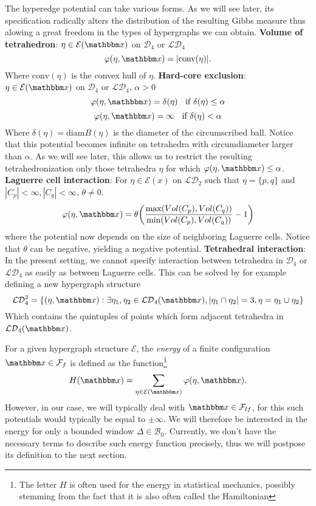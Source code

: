 \begin{example}
	The hyperedge potential can take various forms. As we will see later, its specification radically alters the distribution of the resulting Gibbs measure thus alowing a great freedom in the types of hypergraphs we can obtain.\newline
	\textbf{Volume of tetrahedron}: $\eta\in\mathcal E(\x)$ on $\mathcal D_4$ or $\mathcal {LD}_4$
	$$\varphi(\eta,\x) = |\text{conv}(\eta)| .$$
	Where $\text{conv}(\eta)$ is the convex hull of $\eta$.	\newline
	\textbf{Hard-core exclusion}: $\eta\in\mathcal E(\x)$ on $\mathcal D_4$ or $\mathcal {LD}_4$, $\alpha >0$
	$$\varphi(\eta,\x) = \delta(\eta)\;\; \text{ if } \delta(\eta) \leq \alpha$$
	$$\varphi(\eta,\x) = \infty \;\; \text { if } \delta(\eta) < \alpha$$
	Where $\delta(\eta)= \text{diam}B(\eta)$ is the diameter of the circumscribed ball. Notice that this potential becomes infinite on tetrahedra with circumdiameter larger than $\alpha$. As we will see later, this allows us to restrict the resulting tetrahedronization only those tetrahedra $\eta$ for which $\varphi(\eta,\x) \leq \alpha$.\newline
	\textbf{Laguerre cell interaction}: For $\eta \in \mathcal E(x)$ on $\mathcal {LD}_2$ such that $\eta=\{p,q\}$ and $|C_p| < \infty, |C_q| < \infty$, $\theta \neq 0$.
$$\varphi(\eta,\x) = \theta \bigg (\frac {\max ( Vol(C_p), Vol(C_q))}{\min(Vol(C_p),Vol(C_q))} - 1\bigg)$$
where the potential now depends on the size of neighboring Laguerre cells. Notice that $\theta$ can be negative, yielding a negative potential. \newline
\textbf{Tetrahedral interaction}: In the present setting, we cannot specify interaction between tetrahedra in $\mathcal D_4$ or $\mathcal {LD}_4$ as easily as between Laguerre cells. This can be solved by for example defining a new hypergraph structure
$$\mathcal {LD}^2_4 = \{(\eta,\x): \exists \eta_1,\eta_2\in\mathcal {LD}_4(\x), |\eta_1 \cap \eta_2|=3, \eta = \eta_1 \cup \eta_2\}$$
Which contains the quintuples of points which form adjacent tetrahedra in $\mathcal {LD}_4(\x)$. 
	
\end{example}


For a given hypergraph structure $\mathcal E$, the \textit{energy} of a finite configuration $\x\in\mathcal F_{f}$ is defined as the function\footnote{The letter $H$ is often used for the energy in statistical mechanics, possibly stemming from the fact that it is also often called the Hamiltonian}
$$H(\x) = \sum_{\eta \in \mathcal E(\x)} \varphi(\eta,\x).$$
However, in our case, we will typically deal with $\x\in \mathcal F_{lf}$, for this such potentials would typically be equal to $\pm \infty$. We will therefore be interested in the energy for only a bounded window $\Delta \in \mathcal B_0$. Currently, we don't have the necessary terms to describe such energy function precisely, thus we will postpose its definition to the next section. 

